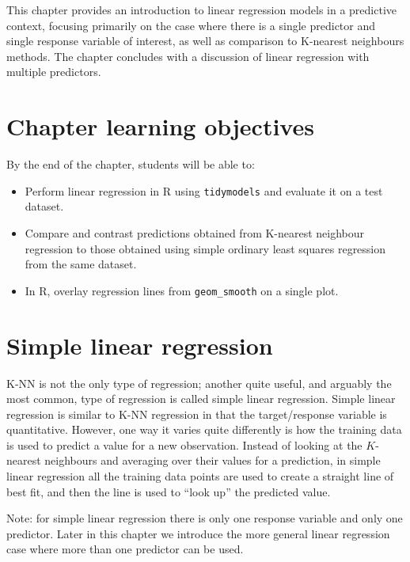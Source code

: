 \documentclass[
]{krantz}
\providecommand{\tightlist}{%
  \setlength{\itemsep}{0pt}\setlength{\parskip}{0pt}}
\renewenvironment{quote}{\begin{VF}}{\end{VF}}
\begin{document}
This chapter provides an introduction to linear regression models
in a predictive context, focusing primarily on the case where
there is a single predictor and single response variable of interest,
as well as comparison to K-nearest neighbours methods. The
chapter concludes with a discussion of linear regression with
multiple predictors.

\hypertarget{chapter-learning-objectives-8}{%
\section{Chapter learning objectives}\label{chapter-learning-objectives-8}}

By the end of the chapter, students will be able to:

\begin{itemize}
\tightlist
\item
  Perform linear regression in R using \texttt{tidymodels} and evaluate it on a test dataset.
\item
  Compare and contrast predictions obtained from K-nearest neighbour regression to those obtained using simple ordinary least squares regression from the same dataset.
\item
  In R, overlay regression lines from \texttt{geom\_smooth} on a single plot.
\end{itemize}

\hypertarget{simple-linear-regression}{%
\section{Simple linear regression}\label{simple-linear-regression}}

K-NN is not the only type of regression; another
quite useful, and arguably the most common, type of regression is
called simple linear regression. Simple
linear regression is similar to K-NN regression in that the target/response
variable is quantitative. However, one way it varies quite
differently is how the training data is used to predict a value for a new
observation. Instead of looking at the \(K\)-nearest neighbours and averaging
over their values for a prediction, in simple linear regression all the
training data points are used to create a straight line of best fit, and then
the line is used to ``look up'' the predicted value.

\begin{quote}
Note: for simple linear
regression there is only one response variable and only one predictor. Later in
this chapter we introduce the more general linear regression case where more
than one predictor can be used.
\end{quote}
\end{document}
